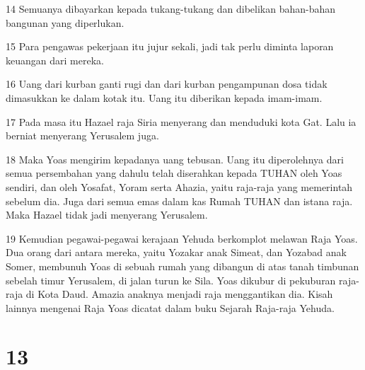 \par 14 Semuanya dibayarkan kepada tukang-tukang dan dibelikan bahan-bahan bangunan yang diperlukan.
\par 15 Para pengawas pekerjaan itu jujur sekali, jadi tak perlu diminta laporan keuangan dari mereka.
\par 16 Uang dari kurban ganti rugi dan dari kurban pengampunan dosa tidak dimasukkan ke dalam kotak itu. Uang itu diberikan kepada imam-imam.
\par 17 Pada masa itu Hazael raja Siria menyerang dan menduduki kota Gat. Lalu ia berniat menyerang Yerusalem juga.
\par 18 Maka Yoas mengirim kepadanya uang tebusan. Uang itu diperolehnya dari semua persembahan yang dahulu telah diserahkan kepada TUHAN oleh Yoas sendiri, dan oleh Yosafat, Yoram serta Ahazia, yaitu raja-raja yang memerintah sebelum dia. Juga dari semua emas dalam kas Rumah TUHAN dan istana raja. Maka Hazael tidak jadi menyerang Yerusalem.
\par 19 Kemudian pegawai-pegawai kerajaan Yehuda berkomplot melawan Raja Yoas. Dua orang dari antara mereka, yaitu Yozakar anak Simeat, dan Yozabad anak Somer, membunuh Yoas di sebuah rumah yang dibangun di atas tanah timbunan sebelah timur Yerusalem, di jalan turun ke Sila. Yoas dikubur di pekuburan raja-raja di Kota Daud. Amazia anaknya menjadi raja menggantikan dia. Kisah lainnya mengenai Raja Yoas dicatat dalam buku Sejarah Raja-raja Yehuda.

\chapter{13}

